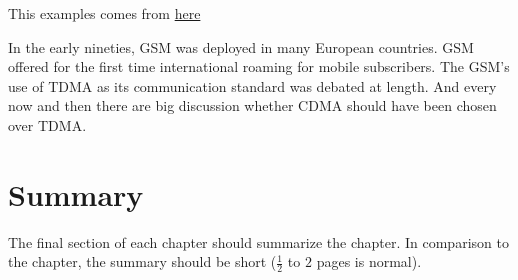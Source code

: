 This examples comes from \href{https://mirror.aarnet.edu.au/pub/CTAN/macros/latex/contrib/acronym/acronym.pdf}{here}

In the early nineties, \acs{GSM} was deployed in many European countries. \ac{GSM} offered for the first time international roaming for mobile subscribers. The \acs{GSM}’s use of \ac{TDMA} as its communication standard was debated at length. And every now and then there are big discussion whether \ac{CDMA} should have been chosen over \ac{TDMA}.

\section{Summary}
\label{s:Background-Summary}

The final section of each chapter should summarize the chapter. In comparison to the chapter, the summary should be short ($\frac{1}{2}$ to $2$ pages is normal).